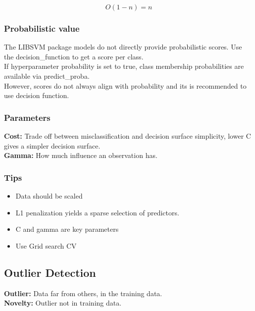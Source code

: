 \documentclass[11pt]{scrartcl} %
\begin{document}
\begin{equation}
	O(1-n) = n
\end{equation}

\subsubsection{Probabilistic value}

The LIBSVM package models do not directly provide probabilistic scores. Use the
decision\_function to get a score per class.\\

If hyperparameter probability is set to true, class membership probabilities are available
via predict\_proba.\\

However, scores do not always align with probability and its is recommended to use decision
function.

\subsubsection{Parameters}

\textbf{Cost:} Trade off between misclassification and decision surface simplicity, lower C
gives a simpler decision surface.\\

\textbf{Gamma:} How much influence an observation has.

\subsubsection{Tips}

\begin{itemize}
	\item Data should be scaled
	\item L1 penalization yields a sparse selection of predictors.
	\item C and gamma are key parameters
	\item Use Grid search CV
\end{itemize}

\subsection{Outlier Detection}

\textbf{Outlier:} Data far from others, in the training data.\\
\textbf{Novelty:} Outlier not in training data.\\
\end{document}
